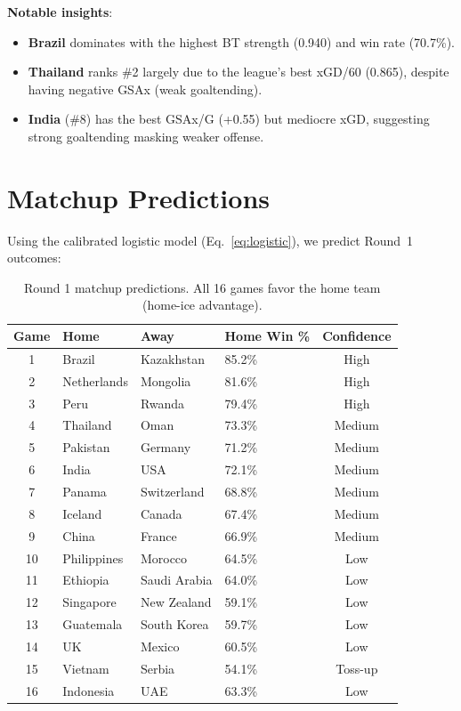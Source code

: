 \documentclass[11pt, a4paper]{article}
\begin{document}
\noindent \textbf{Notable insights}:
\begin{itemize}[nosep]
    \item \textbf{Brazil} dominates with the highest BT strength (0.940) and win rate (70.7\%).
    \item \textbf{Thailand} ranks \#2 largely due to the league's best xGD/60 (0.865), despite having negative GSAx (weak goaltending).
    \item \textbf{India} (\#8) has the best GSAx/G (+0.55) but mediocre xGD, suggesting strong goaltending masking weaker offense.
\end{itemize}

\section{Matchup Predictions}
\label{sec:matchups}

Using the calibrated logistic model (Eq.~\ref{eq:logistic}), we predict Round~1 outcomes:

\begin{table}[H]
\centering
\caption{Round 1 matchup predictions. All 16 games favor the home team (home-ice advantage).}
\label{tab:matchups}
\begin{tabular}{clllc}
\toprule
\textbf{Game} & \textbf{Home} & \textbf{Away} & \textbf{Home Win \%} & \textbf{Confidence} \\
\midrule
1  & Brazil      & Kazakhstan    & 85.2\% & High \\
2  & Netherlands & Mongolia      & 81.6\% & High \\
3  & Peru        & Rwanda        & 79.4\% & High \\
4  & Thailand    & Oman          & 73.3\% & Medium \\
5  & Pakistan    & Germany       & 71.2\% & Medium \\
6  & India       & USA           & 72.1\% & Medium \\
7  & Panama      & Switzerland   & 68.8\% & Medium \\
8  & Iceland     & Canada        & 67.4\% & Medium \\
9  & China       & France        & 66.9\% & Medium \\
10 & Philippines & Morocco       & 64.5\% & Low \\
11 & Ethiopia    & Saudi Arabia  & 64.0\% & Low \\
12 & Singapore   & New Zealand   & 59.1\% & Low \\
13 & Guatemala   & South Korea   & 59.7\% & Low \\
14 & UK          & Mexico        & 60.5\% & Low \\
15 & Vietnam     & Serbia        & 54.1\% & Toss-up \\
16 & Indonesia   & UAE           & 63.3\% & Low \\
\bottomrule
\end{tabular}
\end{table}
\end{document}
